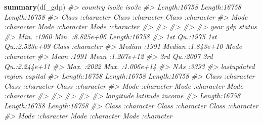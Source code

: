 \documentclass[
  xelatex, ja=standard]{bxjsbook}
\newenvironment{Shaded}{\begin{snugshade}}{\end{snugshade}}
\newcommand{\CommentTok}[1]{\textcolor[rgb]{0.56,0.35,0.01}{\textit{#1}}}
\newcommand{\FunctionTok}[1]{\textcolor[rgb]{0.13,0.29,0.53}{\textbf{#1}}}
\newcommand{\NormalTok}[1]{#1}
\theoremstyle{definition}
\theoremstyle{definition}
\theoremstyle{definition}
\theoremstyle{definition}
\theoremstyle{remark}
\begin{document}
\begin{Shaded}
\begin{Highlighting}[]
\FunctionTok{summary}\NormalTok{(df\_gdp) }
\CommentTok{\#\textgreater{}    country             iso2c              iso3c          }
\CommentTok{\#\textgreater{}  Length:16758       Length:16758       Length:16758      }
\CommentTok{\#\textgreater{}  Class :character   Class :character   Class :character  }
\CommentTok{\#\textgreater{}  Mode  :character   Mode  :character   Mode  :character  }
\CommentTok{\#\textgreater{}                                                          }
\CommentTok{\#\textgreater{}                                                          }
\CommentTok{\#\textgreater{}                                                          }
\CommentTok{\#\textgreater{}                                                          }
\CommentTok{\#\textgreater{}       year           gdp               status         }
\CommentTok{\#\textgreater{}  Min.   :1960   Min.   :8.825e+06   Length:16758      }
\CommentTok{\#\textgreater{}  1st Qu.:1975   1st Qu.:2.523e+09   Class :character  }
\CommentTok{\#\textgreater{}  Median :1991   Median :1.843e+10   Mode  :character  }
\CommentTok{\#\textgreater{}  Mean   :1991   Mean   :1.207e+12                     }
\CommentTok{\#\textgreater{}  3rd Qu.:2007   3rd Qu.:2.244e+11                     }
\CommentTok{\#\textgreater{}  Max.   :2022   Max.   :1.006e+14                     }
\CommentTok{\#\textgreater{}                 NA\textquotesingle{}s   :3393                          }
\CommentTok{\#\textgreater{}  lastupdated           region            capital         }
\CommentTok{\#\textgreater{}  Length:16758       Length:16758       Length:16758      }
\CommentTok{\#\textgreater{}  Class :character   Class :character   Class :character  }
\CommentTok{\#\textgreater{}  Mode  :character   Mode  :character   Mode  :character  }
\CommentTok{\#\textgreater{}                                                          }
\CommentTok{\#\textgreater{}                                                          }
\CommentTok{\#\textgreater{}                                                          }
\CommentTok{\#\textgreater{}                                                          }
\CommentTok{\#\textgreater{}   longitude           latitude            income         }
\CommentTok{\#\textgreater{}  Length:16758       Length:16758       Length:16758      }
\CommentTok{\#\textgreater{}  Class :character   Class :character   Class :character  }
\CommentTok{\#\textgreater{}  Mode  :character   Mode  :character   Mode  :character  }

\end{Highlighting}
\end{Shaded}
\end{document}
